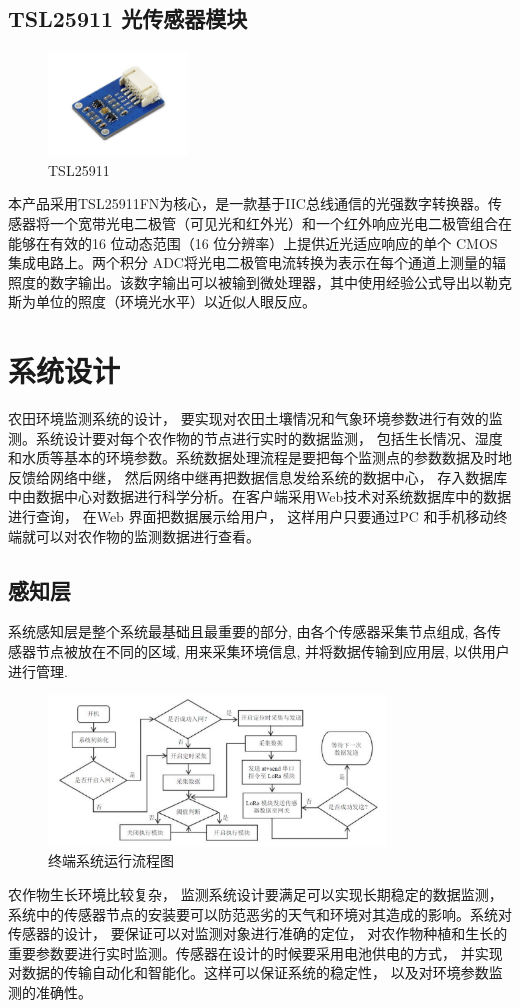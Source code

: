 \documentclass[scheme=chinese,a4paper]{article}
\begin{document}
\subsection{TSL25911 光传感器模块}
\begin{figure}[H]
\centering
\includegraphics[width=0.33\textwidth]{TSL25911.jpg}
\caption{TSL25911}
\end{figure}
本产品采用TSL25911FN为核心，是一款基于IIC总线通信的光强数字转换器。传感器将一个宽带光电二极管（可见光和红外光）和一个红外响应光电二极管组合在能够在有效的16 位动态范围（16 位分辨率）上提供近光适应响应的单个 CMOS 集成电路上。两个积分 ADC将光电二极管电流转换为表示在每个通道上测量的辐照度的数字输出。该数字输出可以被输到微处理器，其中使用经验公式导出以勒克斯为单位的照度（环境光水平）以近似人眼反应。
\section{系统设计}
农田环境监测系统的设计， 要实现对农田土壤情况和气象环境参数进行有效的监测。系统设计要对每个农作物的节点进行实时的数据监测， 包括生长情况、湿度和水质等基本的环境参数。系统数据处理流程是要把每个监测点的参数数据及时地反馈给网络中继， 然后网络中继再把数据信息发给系统的数据中心， 存入数据库中由数据中心对数据进行科学分析。在客户端采用Web技术对系统数据库中的数据进行查询， 在Web 界面把数据展示给用户， 这样用户只要通过PC 和手机移动终端就可以对农作物的监测数据进行查看。
\subsection{感知层}
系统感知层是整个系统最基础且最重要的部分, 由各个传感器采集节点组成, 各传感器节点被放在不同的区域, 用来采集环境信息, 并将数据传输到应用层, 以供用户进行管理. \cite{lorawan_1}
\begin{figure}[H]
\centering
\includegraphics[width=0.8\textwidth]{end_device.jpg}
\caption{终端系统运行流程图}
\end{figure}
农作物生长环境比较复杂， 监测系统设计要满足可以实现长期稳定的数据监测， 系统中的传感器节点的安装要可以防范恶劣的天气和环境对其造成的影响。系统对传感器的设计， 要保证可以对监测对象进行准确的定位， 对农作物种植和生长的重要参数要进行实时监测。传感器在设计的时候要采用电池供电的方式， 并实现对数据的传输自动化和智能化。这样可以保证系统的稳定性， 以及对环境参数监测的准确性。
\end{document}

